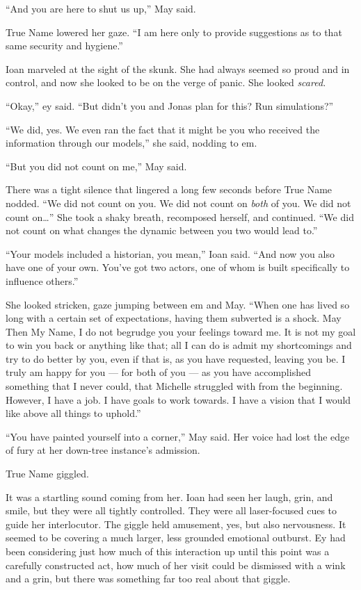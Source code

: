 ``And you are here to shut us up,'' May said.

True Name lowered her gaze. ``I am here only to provide suggestions as to that same security and hygiene.''

Ioan marveled at the sight of the skunk. She had always seemed so proud and in control, and now she looked to be on the verge of panic. She looked \emph{scared.}

``Okay,'' ey said. ``But didn't you and Jonas plan for this? Run simulations?''

``We did, yes. We even ran the fact that it might be you who received the information through our models,'' she said, nodding to em.

``But you did not count on me,'' May said.

There was a tight silence that lingered a long few seconds before True Name nodded. ``We did not count on you. We did not count on \emph{both} of you. We did not count on\ldots{}'' She took a shaky breath, recomposed herself, and continued. ``We did not count on what changes the dynamic between you two would lead to.''

``Your models included a historian, you mean,'' Ioan said. ``And now you also have one of your own. You've got two actors, one of whom is built specifically to influence others.''

She looked stricken, gaze jumping between em and May. ``When one has lived so long with a certain set of expectations, having them subverted is a shock. May Then My Name, I do not begrudge you your feelings toward me. It is not my goal to win you back or anything like that; all I can do is admit my shortcomings and try to do better by you, even if that is, as you have requested, leaving you be. I truly am happy for you — for both of you — as you have accomplished something that I never could, that Michelle struggled with from the beginning. However, I have a job. I have goals to work towards. I have a vision that I would like above all things to uphold.''

``You have painted yourself into a corner,'' May said. Her voice had lost the edge of fury at her down-tree instance's admission.

True Name giggled.

It was a startling sound coming from her. Ioan had seen her laugh, grin, and smile, but they were all tightly controlled. They were all laser-focused cues to guide her interlocutor. The giggle held amusement, yes, but also nervousness. It seemed to be covering a much larger, less grounded emotional outburst. Ey had been considering just how much of this interaction up until this point was a carefully constructed act, how much of her visit could be dismissed with a wink and a grin, but there was something far too real about that giggle.

